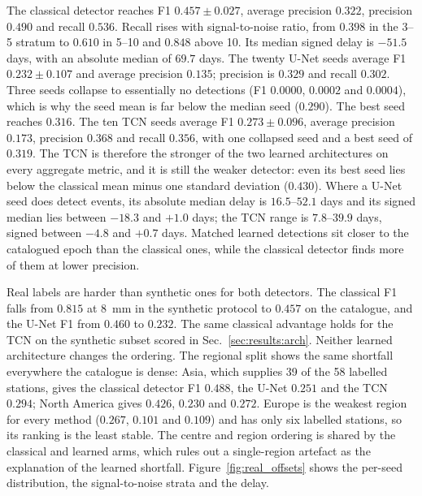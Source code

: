The classical detector reaches F1 $0.457 \pm 0.027$, average precision $0.322$,
precision $0.490$ and recall $0.536$. Recall rises with signal-to-noise ratio,
from $0.398$ in the 3--5 stratum to $0.610$ in 5--10 and $0.848$ above 10.
Its median signed delay is $-51.5$ days, with an absolute median of $69.7$ days.
The twenty U-Net seeds average F1 $0.232 \pm 0.107$ and average precision
$0.135$; precision is $0.329$ and recall $0.302$. Three seeds collapse to
essentially no detections (F1 $0.0000$, $0.0002$ and $0.0004$), which is why the
seed mean is far below the median seed ($0.290$). The best seed reaches $0.316$.
The ten TCN seeds average F1 $0.273 \pm 0.096$, average precision $0.173$,
precision $0.368$ and recall $0.356$, with one collapsed seed and a best seed of
$0.319$. The TCN is therefore the stronger of the two learned architectures on
every aggregate metric, and it is still the weaker detector: even its best seed
lies below the classical mean minus one standard deviation ($0.430$). Where a
U-Net seed does detect events, its absolute median delay is $16.5$--$52.1$ days
and its signed median lies between $-18.3$ and $+1.0$ days; the TCN range is
$7.8$--$39.9$ days, signed between $-4.8$ and $+0.7$ days. Matched learned
detections sit closer to the catalogued epoch than the classical ones, while the
classical detector finds more of them at lower precision.

Real labels are harder than synthetic ones for both detectors. The classical F1
falls from $0.815$ at 8~mm in the synthetic protocol to $0.457$ on the catalogue,
and the U-Net F1 from $0.460$ to $0.232$. The same classical advantage holds for
the TCN on the synthetic subset scored in Sec.~\ref{sec:results:arch}. Neither
learned architecture changes the ordering.
The regional split shows the same shortfall everywhere the catalogue is dense:
Asia, which supplies 39 of the 58 labelled stations, gives the classical
detector F1 $0.488$, the U-Net $0.251$ and the TCN $0.294$; North America gives
$0.426$, $0.230$ and $0.272$. Europe is the weakest region for every method
($0.267$, $0.101$ and $0.109$) and has only six labelled stations, so its
ranking is the least stable. The centre and region ordering is shared by the
classical and learned arms, which rules out a single-region artefact as the
explanation of the learned shortfall. Figure~\ref{fig:real_offsets} shows the
per-seed distribution, the signal-to-noise strata and the delay.

